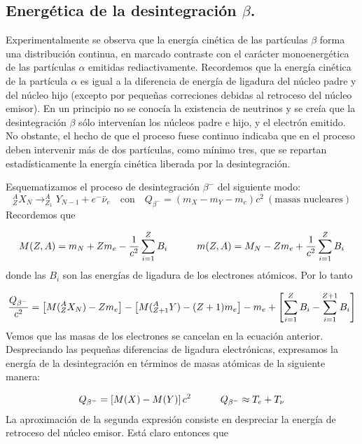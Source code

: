 \subsection{Energética de la desintegración $\beta$.}

Experimentalmente se observa que la energía cinética de las partículas $\beta$ forma una distribución continua, en marcado contraste con el carácter monoenergética de las partículas $\alpha$ emitidas rediactivamente. Recordemos que la energía cinética de la partícula $\alpha$ es igual a la diferencia de energía de ligadura del núcleo padre y del núcleo hijo (excepto por pequeñas correciones debidas al retroceso del núcleo emisor). En un principio no se conocía la existencia de neutrinos y se creía que la desintegración $\beta$ sólo intervenían los núcleos padre e hijo, y el electrón emitido. No obstante, el hecho de que el proceso fuese continuo indicaba que en el proceso deben intervenir más de dos partículas, como mínimo tres, que se repartan estadísticamente la energía cinética liberada por la desintegración. 

Esquematizamos el proceso de desintegración $\beta^-$ del siguiente modo:
\begin{equation}
	^A_Z X_N \longrightarrow _{Z_1}^A Y_{N-1} + e^- \bar{\nu}_e \quad \text{con} \quad Q_{\beta^-} = (m_X-m_Y-m_e)c^2 \ (\text{masas nucleares})
\end{equation}
Recordemos que

\begin{equation*}
	M(Z,A) = m_N + Zm_e - \frac{1}{c^2} \sum_{i=1}^Z B_i \quad \quad \quad
	m(Z,A) = M_N - Zm_e + \frac{1}{c^2} \sum_{i=1}^Z B_i
\end{equation*}
donde las $B_i$ son las energías de ligadura de los electrones atómicos. Por lo tanto

\begin{eqnarray}
	\frac{Q_{\beta^-}}{c^2} = \left[ M(^A_ZX_N) - Zm_e \right] - \left[ M(_{Z+1}^A Y)-(Z+1)m_e \right]  - m_e + \left[ \sum_{i=1}^{Z} B_i - \sum_{i=1}^{Z+1} B_i \right]
\end{eqnarray}
Vemos que las masas de los electrones se cancelan en la ecuación anterior. Despreciando las pequeñas diferencias de ligadura electrónicas, expresamos la energía de la desintegración en términos de masas atómicas de la siguiente manera:

\begin{eqnarray}
	Q_ {\beta^-} = \left[ M(X)-M(Y) \right] c^2 \quad \quad \quad Q_{\beta^-} \approx T_e + T_\nu
\end{eqnarray}
La aproximación de la segunda expresión consiste en despreciar la energía de retroceso del núcleo emisor. Está claro entonces que

